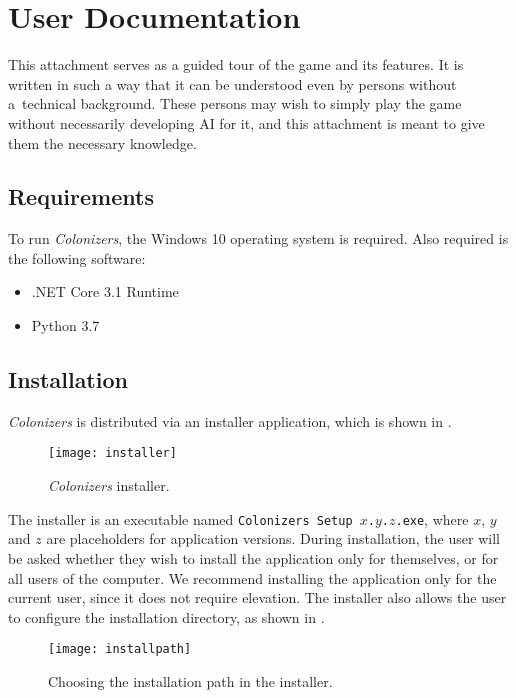 \section{User Documentation}
\label{sec:userdocs}

This attachment serves as a guided tour of the game and its features.
It is written in such a way that it can be understood even by persons
without a~technical background. These persons may wish to simply
play the game without necessarily developing AI for it, and this attachment
is meant to give them the necessary knowledge.

\subsection{Requirements}

To run \emph{Colonizers}, the Windows 10 operating system is required.
Also required is the following software:
\begin{itemize}
    \item .NET Core 3.1 Runtime
    \item Python 3.7
\end{itemize}

\subsection{Installation}

\emph{Colonizers} is distributed via an installer application, which is shown
in .

\begin{figure}[ht]
\centerline{\mbox{\texttt{[image: installer]}}}
\caption{\emph{Colonizers} installer.}\label{ud:installer}
\end{figure}

The installer is an executable named \texttt{Colonizers Setup $x$.$y$.$z$.exe},
where $x$, $y$ and $z$ are placeholders for application versions. During installation,
the user will be asked whether they wish to install the application only for themselves,
or for all users of the computer. We recommend installing the application
only for the current user, since it does not require elevation. The installer
also allows the user to configure the installation directory,
as shown in .

\begin{figure}[ht]
\centerline{\mbox{\texttt{[image: installpath]}}}
\caption{Choosing the installation path in the installer.}\label{ud:installpath}
\end{figure}

